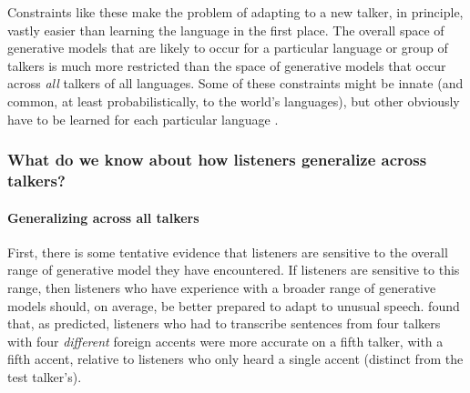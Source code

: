 Constraints like these make the problem of adapting to a new talker, in principle, vastly easier than learning the language in the first place.  The overall space of generative models that are likely to occur for a particular language or group of talkers is much more restricted than the space of generative models that occur across \emph{all} talkers of all languages.  Some of these constraints might be innate (and common, at least probabilistically, to the world's languages), but other obviously have to be learned for each particular language \autocite[like the range of mean VOTs allowed for each category][]{Lisker1964}.

\subsubsection{What do we know about how listeners generalize across talkers?}
\label{sec:what-do-we-know-gen}

\paragraph{Generalizing across all talkers}
\label{sec:gener-across-all}

First, there is some tentative evidence that listeners are sensitive to the overall range of generative model they have encountered.  If listeners are sensitive to this range, then listeners who have experience with a broader range of generative models should, on average, be better prepared to adapt to unusual speech. \textcite{Baese-berk2013} found that, as predicted, listeners who had to transcribe sentences from four talkers with four \emph{different} foreign accents were more accurate on a fifth talker, with a fifth accent, relative to listeners who only heard a single accent (distinct from the test talker's).  

